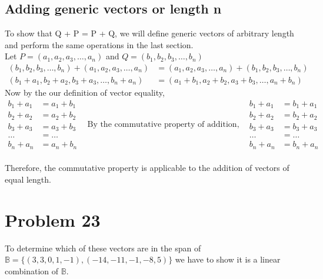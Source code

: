 \documentclass{article}
\begin{document}
\subsection{Adding generic vectors or length n}
To show that Q + P = P + Q, we will define generic vectors of arbitrary length
and perform the same operations in the last section.\\
Let $P = (a_1, a_2, a_3,\ldots,a_n)$ and $Q = (b_1, b_2, b_3, \ldots, b_n)$\\
\begin{equation*}
\begin{split}
(b_1, b_2, b_3, \ldots, b_n) + (a_1, a_2, a_3, \ldots, a_n) &= (a_1, a_2, a_3,
\ldots, a_n) + (b_1, b_2, b_3, \ldots, b_n)\\
(b_1 + a_1, b_2 + a_2, b_3 + a_3, \ldots, b_n + a_n) &= (a_1 + b_1, a_2 + b_2,
a_3 + b_3, \ldots, a_n + b_n)
\end{split}
\end{equation*}
Now by the our definition of vector equality,\\
\begin{equation*}
\begin{split}
b_1 + a_1 &= a_1 + b_1\\
b_2 + a_2 &= a_2 + b_2\\
b_3 + a_3 &= a_3 + b_3\\
\ldots &= \ldots\\
b_n + a_n &= a_n + b_n
\end{split}
\hspace{10pt}\text{By the commutative property of addition,}\hspace{10pt}
\begin{split}
b_1 + a_1 &= b_1 + a_1\\
b_2 + a_2 &= b_2 + a_2\\
b_3 + a_3 &= b_3 + a_3\\
\ldots &= \ldots\\
b_n + a_n &= b_n + a_n
\end{split}
\end{equation*}\\
Therefore, the commutative property is applicable to the addition of vectors of
equal length.
\newpage
\section{Problem 23}
To determine which of these vectors are in the span of $\mathbb{B} =
\{(3,3,0,1,-1),(-14,-11,-1,-8,5)\}$ we have to show it is a linear combination
of $\mathbb{B}$.
\end{document}
